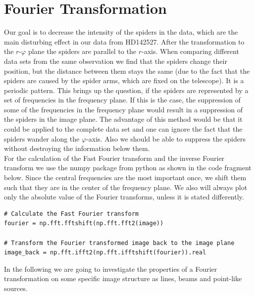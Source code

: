 \section{Fourier Transformation}
\label{sec:fourier}
Our goal is to decrease the intensity of the spiders in the data, which are the main disturbing effect in our data from HD142527. After the transformation to the $r$-$\varphi$ plane the spiders are parallel to the $r$-axis. When comparing different data sets from the same observation we find that the spiders change their position, but the distance between them stays the same (due to the fact that the spiders are caused by the spider arms, which are fixed on the telescope). It is a periodic pattern. This brings up the question, if the spiders are represented by a set of frequencies in the frequency plane. If this is the case, the suppression of some of the frequencies in the frequency plane would result in a suppression of the spiders in the image plane. The advantage of this method would be that it could be applied to the complete data set and one can ignore the fact that the spiders wander along the $\varphi$-axis. Also we should be able to suppress the spiders without destroying the information below them.\\
For the calculation of the Fast Fourier transform and the inverse Fourier transform we use the numpy package from python as shown in the code fragment below. Since the central frequencies are the most important once, we shift them such that they are in the center of the frequency plane. We also will always plot only the absolute value of the Fourier transforms, unless it is stated differently. 
\lstset{language=Python, numbers = none}
\begin{lstlisting}[frame=lines]
# Calculate the Fast Fourier transform
fourier = np.fft.fftshift(np.fft.fft2(image))

# Transform the Fourier transformed image back to the image plane
image_back = np.fft.ifft2(np.fft.ifftshift(fourier)).real
\end{lstlisting}
In the following we are going to investigate the properties of a Fourier transformation on some specific image structure as lines, beams and point-like sources.\\

